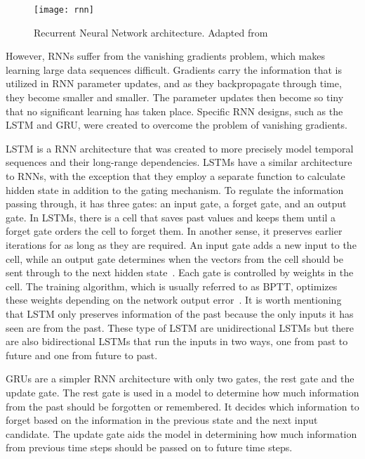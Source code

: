 \begin{figure}[htbp]
    \centering
    \texttt{[image: rnn]}
    \caption{Recurrent Neural Network architecture. Adapted from~\cite{Gupta2017RecurrentLearning}}
    \label{fig:rnn}
\end{figure}

However, \gls{RNN}s suffer from the vanishing gradients problem, which makes learning large data sequences difficult. Gradients carry the information that is utilized in \gls{RNN} parameter updates, and as they backpropagate through time, they become smaller and smaller. The parameter updates then become so tiny that no significant learning has taken place. Specific \gls{RNN} designs, such as the \gls{LSTM} and \gls{GRU}, were created to overcome the problem of vanishing gradients.

\gls{LSTM} is a \gls{RNN} architecture that was created to more precisely model temporal sequences and their long-range dependencies. \gls{LSTM}s have a similar architecture to \gls{RNN}s, with the exception that they employ a separate function to calculate hidden state in addition to the gating mechanism. To regulate the information passing through, it has three gates: an input gate, a forget gate, and an output gate. In \gls{LSTM}s, there is a cell that saves past values and keeps them until a forget gate orders the cell to forget them. In another sense, it preserves earlier iterations for as long as they are required. An input gate adds a new input to the cell, while an output gate determines when the vectors from the cell should be sent through to the next hidden state~\cite{Khan2019RNN-LSTM-GRUTransformation}. Each gate is controlled by weights in the cell. The training algorithm, which is usually referred to as \gls{BPTT}, optimizes these weights depending on the network output error~\cite{Madhavan2021DeepDeveloper}. It is worth mentioning that \gls{LSTM} only preserves information of the past because the only inputs it has seen are from the past. These type of \gls{LSTM} are unidirectional \gls{LSTM}s but there are also bidirectional \gls{LSTM}s that run the inputs in two ways, one from past to future and one from future to past. 



\gls{GRU}s are a simpler \gls{RNN} architecture with only two gates, the rest gate and the update gate. The rest gate is used in a model to determine how much information from the past should be forgotten or remembered. It decides which information to forget based on the information in the previous state and the next input candidate. The update gate aids the model in determining how much information from previous time steps should be passed on to future time steps.

